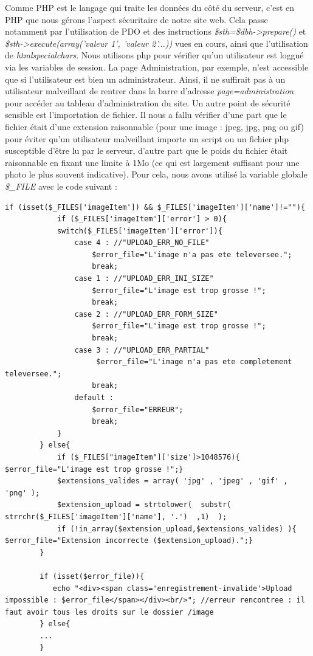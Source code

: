 \documentclass[titlepage,11pt,a4paper]{article}
\begin{document}
Comme PHP est le langage qui traite les données du côté du serveur, c'est en PHP que nous gérons l'aspect sécuritaire de notre site web. Cela passe notamment par l'utilisation de PDO et des instructions \emph{\$sth=\$dbh->prepare()} et \emph{\$sth->execute(array('valeur 1', 'valeur 2'...))} vues en cours, ainsi que l'utilisation de \emph{htmlspecialchars}. Nous utilisons php pour vérifier qu'un utilisateur est loggué via les variables de session. La page Administration, par exemple, n'est accessible que si l'utilisateur est bien un administrateur. Ainsi, il ne suffirait pas à un utilisateur malveillant de rentrer dans la barre d'adresse \emph{page=administration} pour accéder au tableau d'administration du site. Un autre point de sécurité sensible est l'importation de fichier. Il nous a fallu vérifier d'une part que le fichier était d'une extension raisonnable (pour une image : jpeg, jpg, png ou gif) pour éviter qu'un utilisateur malveillant importe un script ou un fichier php susceptible d'être lu par le serveur, d'autre part que le poids du fichier était raisonnable en fixant une limite à 1Mo (ce qui est largement suffisant pour une photo le plus souvent indicative). Pour cela, nous avons utilisé la variable globale \emph{\$\_FILE} avec le code suivant :

\begin{lstlisting}[title=Securite upload image]
if (isset($_FILES['imageItem']) && $_FILES['imageItem']['name']!=""){
            if ($_FILES['imageItem']['error'] > 0){
            switch($_FILES['imageItem']['error']){
                case 4 : //"UPLOAD_ERR_NO_FILE"
                    $error_file="L'image n'a pas ete televersee.";
                    break;
                case 1 : //"UPLOAD_ERR_INI_SIZE"
                    $error_file="L'image est trop grosse !";
                    break;
                case 2 : //"UPLOAD_ERR_FORM_SIZE"
                    $error_file="L'image est trop grosse !";
                    break;
                case 3 : //"UPLOAD_ERR_PARTIAL"
                     $error_file="L'image n'a pas ete completement televersee.";
                    break;
                default :
                    $error_file="ERREUR";
                    break;
            }
        } else{
            if ($_FILES["imageItem"]['size']>1048576){ $error_file="L'image est trop grosse !";}
            $extensions_valides = array( 'jpg' , 'jpeg' , 'gif' , 'png' );
            $extension_upload = strtolower(  substr(  strrchr($_FILES['imageItem']['name'], '.')  ,1)  );
            if (!in_array($extension_upload,$extensions_valides) ){ $error_file="Extension incorrecte ($extension_upload).";}
        }
        
        if (isset($error_file)){
           echo "<div><span class='enregistrement-invalide'>Upload impossible : $error_file</span></div><br/>"; //erreur rencontree : il faut avoir tous les droits sur le dossier /image
        } else{
        ...
        }
\end{lstlisting}
\end{document}
